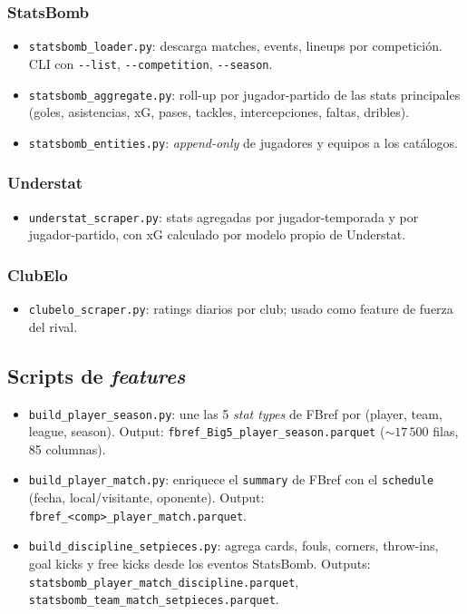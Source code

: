 \subsubsection{StatsBomb}

\begin{itemize}[noitemsep]
  \item \texttt{statsbomb\_loader.py}: descarga matches, events, lineups por competición. CLI con \texttt{-{}-list}, \texttt{-{}-competition}, \texttt{-{}-season}.
  \item \texttt{statsbomb\_aggregate.py}: roll-up por jugador-partido de las stats principales (goles, asistencias, xG, pases, tackles, intercepciones, faltas, dribles).
  \item \texttt{statsbomb\_entities.py}: \emph{append-only} de jugadores y equipos a los catálogos.
\end{itemize}

\subsubsection{Understat}

\begin{itemize}[noitemsep]
  \item \texttt{understat\_scraper.py}: stats agregadas por jugador-temporada y por jugador-partido, con xG calculado por modelo propio de Understat.
\end{itemize}

\subsubsection{ClubElo}

\begin{itemize}[noitemsep]
  \item \texttt{clubelo\_scraper.py}: ratings diarios por club; usado como feature de fuerza del rival.
\end{itemize}

\subsection{Scripts de \emph{features}}

\begin{itemize}[noitemsep]
  \item \texttt{build\_player\_season.py}: une las 5 \emph{stat types} de FBref por (player, team, league, season). Output: \texttt{fbref\_Big5\_player\_season.parquet} ($\sim 17\,500$ filas, 85 columnas).
  \item \texttt{build\_player\_match.py}: enriquece el \texttt{summary} de FBref con el \texttt{schedule} (fecha, local/visitante, oponente). Output: \texttt{fbref\_<comp>\_player\_match.parquet}.
  \item \texttt{build\_discipline\_setpieces.py}: agrega cards, fouls, corners, throw-ins, goal kicks y free kicks desde los eventos StatsBomb. Outputs: \texttt{statsbomb\_player\_match\_discipline.parquet}, \texttt{statsbomb\_team\_match\_setpieces.parquet}.
\end{itemize}

